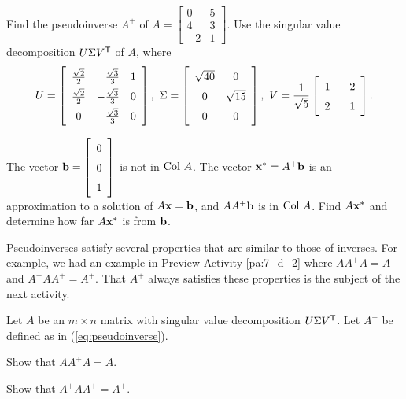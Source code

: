 \begin{activity} \hfill
    \ba
    \item Find the pseudoinverse $A^+$ of $A = \left[ \begin{array}{rc} 0&5\\ 4&3 \\ -2&1 \end{array} \right]$. Use the singular value decomposition $U \Sigma V^{\mathsf{T}}$ of $A$, where 
\[U = \renewcommand{\arraystretch}{1.5} \left[ \begin{array}{crc} \frac{\sqrt{2}}{2}&\frac{\sqrt{3}}{3}&1 \\ \frac{\sqrt{2}}{2}&-\frac{\sqrt{3}}{3}&0 \\ 0&\frac{\sqrt{3}}{3}&0 \end{array} \right], \ 
\Sigma = \renewcommand{\arraystretch}{1.5} \left[ \begin{array}{cc} \sqrt{40}&0 \\ 0&\sqrt{15} \\ 0&0 \end{array} \right], \ 
V = \frac{1}{\sqrt{5}} \left[ \begin{array}{cr} 1&-2 \\ 2&1 \end{array} \right].\]


    \item The vector $\vb = \left[ \begin{array}{c} 0\\0\\1 \end{array} \right]$ is not in $\text{Col } A$. The vector $\mathbf{x}^* = A^+ \mathbf{b}$ is an approximation to a solution of $A \mathbf{x} = \mathbf{b}$, and $AA^+\mathbf{b}$ is in $\text{Col } A$. Find $A\mathbf{x}^*$ and determine how far $A\mathbf{x}^*$ is from $\mathbf{b}$.



    \ea
\end{activity}

Pseudoinverses satisfy several properties that are similar to those of inverses. For example, we had an example in Preview Activity \ref{pa:7_d_2} where $AA^{+}A = A$ and $A^+AA^+ = A^+$. That $A^+$ always satisfies these properties is the subject of the next activity.

\begin{activity} \label{act:7_d_Moore-Penrose} Let $A$ be an $m \times n$ matrix with singular value decomposition $U \Sigma V^{\mathsf{T}}$. Let $A^{+}$ be defined as in (\ref{eq:pseudoinverse}). 
	\ba
	\item Show that $AA^{+}A = A$.

	\item Show that $A^{+}AA^{+} = A^{+}$.
	
	\ea
\end{activity}

